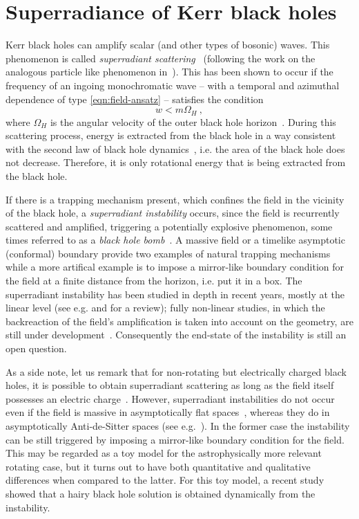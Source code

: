 \section{Superradiance of Kerr black holes}

Kerr black holes can amplify scalar (and other types of bosonic) waves.
This phenomenon is called \textit {superradiant scattering}~\cite{Misner:1972kx} (following the work on the analogous particle like phenomenon in~\cite{Penrose:1969pc,Christodoulou:1970wf}).
This has been shown to occur if the frequency of an ingoing monochromatic wave -- with a temporal and azimuthal dependence of type \eqref{eqn:field-ansatz} -- satisfies the condition 
\begin{equation}
w<m\Omega_H \ , 
\label{super_cond}
\end{equation}
where $\Omega_H$ is the angular velocity of the outer black hole horizon~\cite{Bardeen:1972fi,Starobinsky:1973a,Press:1972zz}.
During this scattering process, energy is extracted from the black hole in a way consistent with the second law of black hole dynamics~\cite{Bardeen:1973gs}, i.e. the area of the black hole does not decrease.
Therefore, it is only rotational energy that is being extracted from the black hole.

If there is a trapping mechanism present, which confines the field in the vicinity of the black hole, a \textit{superradiant instability} occurs, since the field is recurrently scattered and amplified, triggering a potentially explosive phenomenon, some times referred to as a \textit{black hole bomb}~\cite{Press:1972zz}. 
A massive field or a timelike asymptotic (conformal) boundary provide two examples of natural trapping mechanisms while a more artifical example is to impose a mirror-like boundary condition for the field at a finite distance from the horizon, i.e. put it in a box.
The superradiant instability has been studied in depth in recent years, mostly at the linear level (see e.g. \cite{Dolan:2007mj,Dolan:2012yt} and \cite{Cardoso:2013krh} for a review); fully non-linear studies, in which the backreaction of the field's amplification is taken into account on the geometry, are still under development~\cite{Okawa:2014nda,East:2013mfa}.
Consequently the end-state of the instability is still an open question.

As a side note, let us remark that for non-rotating but electrically charged black holes, it is possible to obtain superradiant scattering as long as the field itself possesses an electric charge~\cite{Bekenstein:1973mi}.
However, superradiant instabilities do not occur even if the field is massive in asymptotically flat spaces~\cite{Hod:2013eea,Hod:2013nn}, whereas they do in asymptotically Anti-de-Sitter spaces (see e.g.~\cite{Wang:2014eha}).
In the former case the instability can be still triggered by imposing a mirror-like boundary condition for the field\cite{Herdeiro:2013pia,Hod:2013fvl,Degollado:2013bha}.
This may be regarded as a toy model for the astrophysically more relevant rotating case, but it turns out to have both quantitative and qualitative differences when compared to the latter.  
For this toy model, a recent study showed that a hairy black hole solution is obtained dynamically from the instability\cite{Sanchis-Gual:2015lje}.

